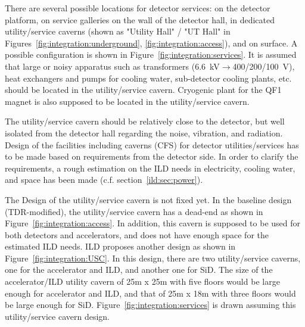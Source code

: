 There are several possible locations for detector services: on the detector platform, on service galleries on the wall of the detector hall, in dedicated utility/service caverns (shown as "Utility Hall" / "UT Hall" in Figures~\ref{fig:integration:underground}, \ref{fig:integration:access}), and on surface. A possible configuration is shown in Figure~\ref{fig:integration:services}.
It is assumed that large or noisy apparatus such as transformers (6.6~kV$\rightarrow$400/200/100~V), heat exchangers and pumps for cooling water, sub-detector cooling plants, etc. should be located in the utility/service cavern. Cryogenic plant for the QF1 magnet is also supposed to be located in the utility/service cavern.

The utility/service cavern should be relatively close to the detector, but well isolated from the detector hall  regarding the noise, vibration, and radiation. Design of the facilities including caverns (CFS) for detector utilities/services has to be made based on requirements from the detector side. In order to clarify the requirements, a rough estimation on the ILD needs in electricity, cooling water, and space has been made (c.f. section~\ref{ild:sec:power}). 

The Design of the utility/service cavern is not fixed yet. In the baseline design (TDR-modified), the utility/service cavern has a dead-end as shown in Figure~\ref{fig:integration:access}. In addition, this cavern is supposed to be used for both detectors and accelerators, and does not have enough space for the estimated ILD needs. 
ILD proposes another design as shown in Figure~\ref{fig:integration:USC}. In this design, there are two utility/service caverns, one for the accelerator and ILD, and another one for SiD. The size of the accelerator/ILD utility cavern of 25m x 25m with five floors would be large enough for accelerator and ILD, and that of 25m x 18m with three floors would be large enough for SiD. Figure~\ref{fig:integration:services} is drawn assuming this utility/service cavern design.

